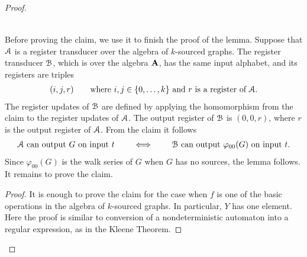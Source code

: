 \begin{proof}
\begin{claim}
\begin{align*}
{            }
            \end{align*}
        \end{claim}
        Before proving the claim, we use it to finish the proof of the lemma. Suppose that ${{\mathcal A}}$ is a register transducer over the algebra of $k$-sourced graphs. The register transducer  ${\mathcal B}$, which is over the algebra $\mathbf{A}$, has the same input alphabet, and its registers are triples 
        \begin{align*}
        (i,j,r) \qquad \text{where $i,j \in \{0,\ldots,k\}$ and $r$ is a register of ${{\mathcal A}}$.}
        \end{align*}
         The register updates of ${\mathcal B}$ are defined by applying the homomorphism from the claim  to the register updates of ${{\mathcal A}}$. 
        The output register of ${\mathcal B}$ is $(0,0,r)$, where  $r$ is the output register of ${{\mathcal A}}$.  From the claim it follows 
        \begin{align*}
        \text{${{\mathcal A}}$ can output $G$ on input $t$} \qquad \iff \qquad 
        \text{${\mathcal B}$ can output $\varphi_{00}(G)$ on input $t$}.
        \end{align*}
        Since $\varphi_{00}(G)$ is the walk series of $G$ when $G$ has no sources, the lemma follows. It remains to prove the claim.

        \begin{proof} 
            It is enough to prove the claim for the case when $f$ is one of the basic operations in the algebra of $k$-sourced graphs. In particular, $Y$ has one element. Here the proof is similar to conversion of a nondeterministic automaton into a regular expression, as in the Kleene Theorem.
            

\end{proof}
\end{proof}
